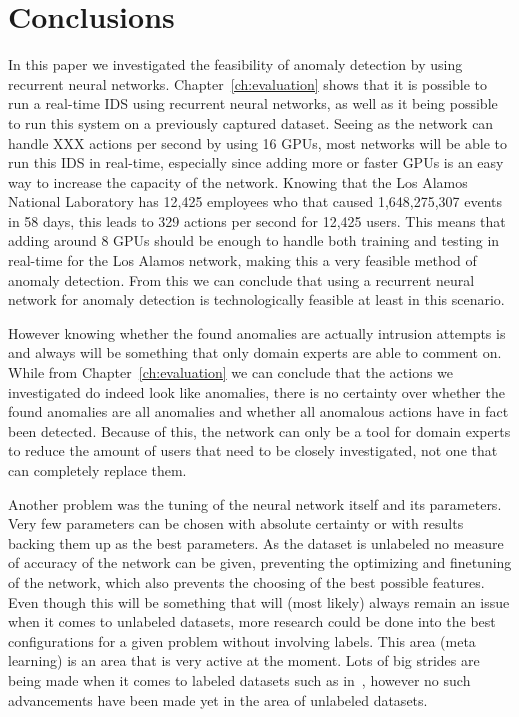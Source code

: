 \chapter{Conclusions}\label{ch:conclusions}

In this paper we investigated the feasibility of anomaly detection by using recurrent neural networks. Chapter~\ref{ch:evaluation} shows that it is possible to run a real-time IDS using recurrent neural networks, as well as it being possible to run this system on a previously captured dataset. Seeing as the network can handle XXX actions per second by using 16 GPUs, most networks will be able to run this IDS in real-time, especially since adding more or faster GPUs is an easy way to increase the capacity of the network. Knowing that the Los Alamos National Laboratory has 12,425 employees who that caused 1,648,275,307 events in 58 days, this leads to 329 actions per second for 12,425 users. This means that adding around 8 GPUs should be enough to handle both training and testing in real-time for the Los Alamos network, making this a very feasible method of anomaly detection. From this we can conclude that using a recurrent neural network for anomaly detection is technologically feasible at least in this scenario. 

However knowing whether the found anomalies are actually intrusion attempts is and always will be something that only domain experts are able to comment on. While from Chapter~\ref{ch:evaluation} we can conclude that the actions we investigated do indeed look like anomalies, there is no certainty over whether the found anomalies are all anomalies and whether all anomalous actions have in fact been detected. Because of this, the network can only be a tool for domain experts to reduce the amount of users that need to be closely investigated, not one that can completely replace them. 

Another problem was the tuning of the neural network itself and its parameters. Very few parameters can be chosen with absolute certainty or with results backing them up as the best parameters. As the dataset is unlabeled no measure of accuracy of the network can be given, preventing the optimizing and finetuning of the network, which also prevents the choosing of the best possible features. Even though this will be something that will (most likely) always remain an issue when it comes to unlabeled datasets, more research could be done into the best configurations for a given problem without involving labels. This area (meta learning) is an area that is very active at the moment. Lots of big strides are being made when it comes to labeled datasets such as in~\cite{zoph2016neural}, however no such advancements have been made yet in the area of unlabeled datasets.

